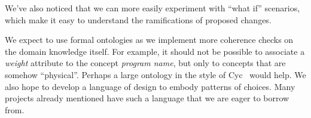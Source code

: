 \documentclass[a4paper,UKenglish,cleveref,autoref,thm-restate]{oasics-v2021}
\begin{document}
We've also noticed that we can more easily experiment with ``what if'' scenarios,
which make it easy to understand the ramifications of proposed changes.  

We expect to use formal ontologies as we implement
more coherence checks on the domain knowledge itself. For example, it should not
be possible to associate a \textit{weight} attribute to the concept
\textit{program name}, but only to concepts that are somehow ``physical''. 
Perhaps a large ontology in the style of Cyc~\cite{lenat1995cyc} would help.
We also hope to develop a language of design to embody patterns of choices.
Many projects already mentioned have such a language that we are eager to
borrow from.




\end{document}
